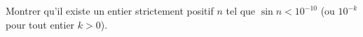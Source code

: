 Montrer qu'il existe un entier strictement positif $n$ tel que $\sin n < 10^{-10}$ (ou $10^{-k}$ pour tout entier $k > 0$).
